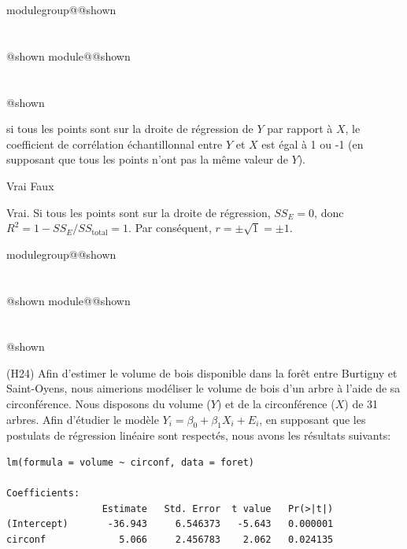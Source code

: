 \documentclass{Evaluation}
\makeatletter
\newcommand{\currentmodulekey}{}
\newcommand{\currentmoduletitle}{}
\newcommand{\currentgroupkey}{}
\newcommand{\currentgrouptitle}{}
\newcommand{\showmoduleifneeded}{%
  \ifx\currentgroupkey\empty\else
    \expandafter\ifx\csname modulegroup@\currentgroupkey @shown\endcsname\relax
      \section*{\currentgrouptitle}%
      \expandafter\gdef\csname modulegroup@\currentgroupkey @shown\endcsname{1}%
    \fi
  \fi
  \expandafter\ifx\csname module@\currentmodulekey @shown\endcsname\relax
    \section*{\currentmoduletitle}%
    \expandafter\gdef\csname module@\currentmodulekey @shown\endcsname{1}%
  \fi
}
\newenvironment{A23}{\showmoduleifneeded}{}
\newenvironment{H24}{\showmoduleifneeded}{}
\makeatother
\begin{document}
\begin{questions}
\begin{A23}
\begin{parts}
\begin{subparts}
    \subpart si tous les points sont sur la droite de régression de $Y$ par rapport à $X$, le coefficient de corrélation échantillonnal  entre $Y$ et $X$ est égal à 1 ou -1 (en supposant que tous les points n'ont pas la même valeur de $Y$).

     \begin{oneparcheckboxes}
        \CorrectChoice Vrai
        \choice Faux
    \end{oneparcheckboxes}

\begin{solution}
Vrai. Si tous les points sont sur la droite de régression, $SS_E = 0$, donc $R^2 = 1 - SS_E/SS_{\text{total}} = 1$. Par conséquent, $r = \pm\sqrt{1} = \pm 1$.
\end{solution}

\end{subparts}

\end{parts}
\end{A23}

\begin{H24}
\question
(H24)
Afin d'estimer le volume de bois disponible dans la forêt entre Burtigny et Saint-Oyens, nous aimerions modéliser le volume de bois d'un arbre à l'aide de sa circonférence. Nous disposons du volume ($Y$) et de la circonférence ($X$) de 31 arbres. Afin d'étudier le modèle $Y_i = \beta_0 + \beta_1 X_i + E_i$, en supposant que les postulats de régression linéaire sont respectés, nous avons les résultats suivants:

\begin{verbatim}
lm(formula = volume ~ circonf, data = foret)

Coefficients:
                 Estimate   Std. Error  t value   Pr(>|t|)
(Intercept)       -36.943     6.546373   -5.643   0.000001
circonf             5.066     2.456783    2.062   0.024135

\end{verbatim}

\end{H24}
\end{questions}
\end{document}
